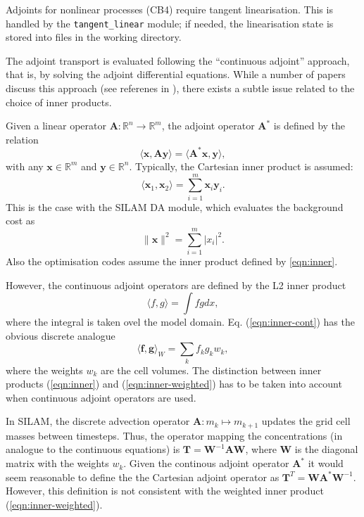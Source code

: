 \documentclass[a4paper]{article}
\begin{document}
Adjoints for nonlinear processes (CB4) require tangent linearisation. This is handled by
the \verb|tangent_linear| module; if needed, the linearisation state is stored into files in the
working directory.

The adjoint transport is evaluated following the ``continuous adjoint'' approach, that is,
by solving the adjoint differential equations. While a number of papers discuss this
approach (see referenes in \citet{vira2017data}), there exists a subtle issue related to
the choice of inner products.

Given a linear operator $\mathbf{A}: \mathbb{R}^n \to \mathbb{R}^m$, the adjoint operator
$\mathbf{A}^*$ is defined by the relation
\begin{equation}
\label{eqn:adjoint}
\langle \mathbf{x}, \mathbf{Ay} \rangle = \langle \mathbf{A}^*\mathbf{x}, \mathbf{y} \rangle,
\end{equation}
with any $\mathbf{x} \in \mathbb{R}^m$ and $\mathbf{y} \in \mathbb{R}^n$. Typically, the
Cartesian inner product is assumed:
\begin{equation}
\label{eqn:inner}
\langle \mathbf{x}_1, \mathbf{x}_2 \rangle = \sum_{i=1}^m \mathbf{x}_i\mathbf{y}_i.
\end{equation}
This is the case with the SILAM DA module, which evaluates the background cost as
\begin{equation}
\|\mathbf{x}\|^2 = \sum_{i=1}^m |x_i|^2.
\end{equation} 
Also the optimisation codes assume the inner product defined by \ref{eqn:inner}. 

However, the continuous adjoint operators are defined by the L2 inner product
\begin{equation}
\label{eqn:inner-cont}
\langle f, g \rangle = \int fgdx,
\end{equation}
where the integral is taken ovel the model domain. Eq. (\ref{eqn:inner-cont}) has the
obvious discrete analogue
\begin{equation}
\label{eqn:inner-weighted}
\langle \mathbf{f}, \mathbf{g} \rangle_W = \sum_k f_k g_k w_k,
\end{equation}
where the weights $w_k$ are the cell volumes. The distinction between inner products
(\ref{eqn:inner}) and (\ref{eqn:inner-weighted}) has to be taken into account when
continuous adjoint operators are used. 

In SILAM, the discrete advection operator $\mathbf{A}: m_k \mapsto m_{k+1}$ updates the
grid cell masses between timesteps. Thus, the operator mapping the concentrations (in
analogue to the continuous equations) is $\mathbf{T} = \mathbf{W}^{-1} \mathbf{AW}$, where
$\mathbf{W}$ is the diagonal matrix with the weights $w_k$. Given the continous adjoint
operator $\mathbf{A}^*$ it would seem reasonable to define the the Cartesian adjoint
operator as $\mathbf{T}^T = \mathbf{W} \mathbf{A}^* \mathbf{W}^{-1}$. However, this
definition is not consistent with the weighted inner product (\ref{eqn:inner-weighted}).
\end{document}
